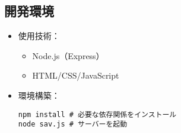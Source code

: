 \documentclass[uplatex,dvipdfmx]{jsarticle}
\begin{document}
\subsection{開発環境}
\begin{itemize}
    \item 使用技術：
    \begin{itemize}
        \item Node.js（Express）
        \item HTML/CSS/JavaScript
    \end{itemize}
    \item 環境構築：
    \begin{lstlisting}[caption=環境構築コマンド]
npm install # 必要な依存関係をインストール
node sav.js # サーバーを起動
    \end{lstlisting}
\end{itemize}
\end{document}
